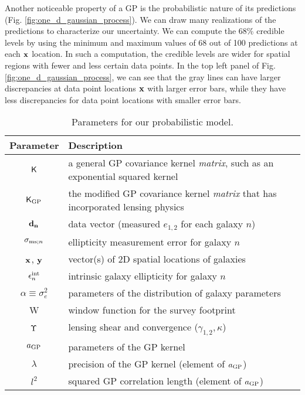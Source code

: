 Another noticeable property of a GP is the probabilistic nature of its predictions
(Fig. \ref{fig:one_d_gaussian_process}).
We can draw many realizations of the predictions to characterize our uncertainty. 
We can compute the 68\% credible levels
by using the minimum and maximum values of 68 out of 100 predictions at each
$\mathbf{x}$ location.
In such a computation, the credible levels are wider for spatial regions 
with fewer and less certain data points. In the top left panel of Fig.
\ref{fig:one_d_gaussian_process}, we can see that the gray lines can have
larger discrepancies at data point locations $\mathbf{x}$ with larger error bars, while they
have less discrepancies for data point locations with smaller error bars.

\begin{table}%
\begin{center}
\caption{Parameters for our probabilistic model.}
\label{tab:sampling_parameters}
\begin{tabular}{cl}
\hline
Parameter & Description \\
\hline
$\mathsf{K}$ & a general GP covariance kernel {\it matrix}, such as an exponential squared kernel \\
$\mathsf{K}_{\rm GP}$  & the modified GP covariance kernel {\it matrix} that has incorporated
lensing physics\\
${\bf d_{n}}$ & data vector (measured $e_{1,2}$ for each galaxy $n$)  \\
$\sigma_{{\rm ms}; n}$ & ellipticity measurement error for galaxy $n$ 
\\
$\mathbf{x}$, $\mathbf{y}$ & vector(s) of 2D spatial locations of galaxies \\
$\epsilon_n^{\rm int}$ & intrinsic galaxy ellipticity for galaxy $n$ \\
$\alpha\equiv\sigma_{e}^2$ & parameters of the distribution of galaxy parameters \\
W & window function for the survey footprint \\
$\Upsilon$ & lensing shear and convergence ($\gamma_{1,2}, \kappa$) \\
$a_{\rm GP}$ & parameters of the GP kernel\\
$\lambda$ & precision of the GP kernel (element of $a_{\rm GP}$) \\
$l^2$ & squared GP correlation length (element of $a_{\rm GP}$) \\
\hline
\end{tabular}
\end{center}
\end{table}


